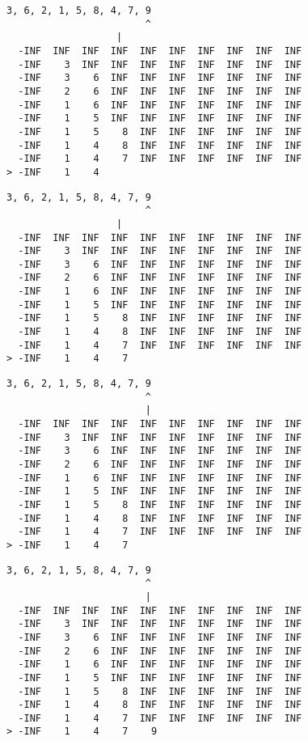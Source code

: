 { \begin{verbatim}
3, 6, 2, 1, 5, 8, 4, 7, 9
                        ^
                   |
  -INF  INF  INF  INF  INF  INF  INF  INF  INF  INF
  -INF    3  INF  INF  INF  INF  INF  INF  INF  INF
  -INF    3    6  INF  INF  INF  INF  INF  INF  INF
  -INF    2    6  INF  INF  INF  INF  INF  INF  INF
  -INF    1    6  INF  INF  INF  INF  INF  INF  INF
  -INF    1    5  INF  INF  INF  INF  INF  INF  INF
  -INF    1    5    8  INF  INF  INF  INF  INF  INF
  -INF    1    4    8  INF  INF  INF  INF  INF  INF
  -INF    1    4    7  INF  INF  INF  INF  INF  INF
> -INF    1    4                                   
\end{verbatim} }

{ \begin{verbatim}
3, 6, 2, 1, 5, 8, 4, 7, 9
                        ^
                   |
  -INF  INF  INF  INF  INF  INF  INF  INF  INF  INF
  -INF    3  INF  INF  INF  INF  INF  INF  INF  INF
  -INF    3    6  INF  INF  INF  INF  INF  INF  INF
  -INF    2    6  INF  INF  INF  INF  INF  INF  INF
  -INF    1    6  INF  INF  INF  INF  INF  INF  INF
  -INF    1    5  INF  INF  INF  INF  INF  INF  INF
  -INF    1    5    8  INF  INF  INF  INF  INF  INF
  -INF    1    4    8  INF  INF  INF  INF  INF  INF
  -INF    1    4    7  INF  INF  INF  INF  INF  INF
> -INF    1    4    7                              
\end{verbatim} }

{ \begin{verbatim}
3, 6, 2, 1, 5, 8, 4, 7, 9
                        ^
                        |
  -INF  INF  INF  INF  INF  INF  INF  INF  INF  INF
  -INF    3  INF  INF  INF  INF  INF  INF  INF  INF
  -INF    3    6  INF  INF  INF  INF  INF  INF  INF
  -INF    2    6  INF  INF  INF  INF  INF  INF  INF
  -INF    1    6  INF  INF  INF  INF  INF  INF  INF
  -INF    1    5  INF  INF  INF  INF  INF  INF  INF
  -INF    1    5    8  INF  INF  INF  INF  INF  INF
  -INF    1    4    8  INF  INF  INF  INF  INF  INF
  -INF    1    4    7  INF  INF  INF  INF  INF  INF
> -INF    1    4    7                              
\end{verbatim} }

{ \begin{verbatim}
3, 6, 2, 1, 5, 8, 4, 7, 9
                        ^
                        |
  -INF  INF  INF  INF  INF  INF  INF  INF  INF  INF
  -INF    3  INF  INF  INF  INF  INF  INF  INF  INF
  -INF    3    6  INF  INF  INF  INF  INF  INF  INF
  -INF    2    6  INF  INF  INF  INF  INF  INF  INF
  -INF    1    6  INF  INF  INF  INF  INF  INF  INF
  -INF    1    5  INF  INF  INF  INF  INF  INF  INF
  -INF    1    5    8  INF  INF  INF  INF  INF  INF
  -INF    1    4    8  INF  INF  INF  INF  INF  INF
  -INF    1    4    7  INF  INF  INF  INF  INF  INF
> -INF    1    4    7    9                         
\end{verbatim} }

